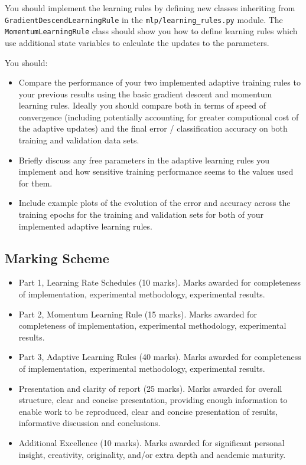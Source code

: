 \documentclass[11pt,]{article}
\begin{document}
You should implement the learning rules by defining new classes
inheriting from \texttt{GradientDescendLearningRule} in the
\texttt{mlp/learning\_rules.py} module. The
\texttt{MomentumLearningRule} class should show you how to define
learning rules which use additional state variables to calculate the
updates to the parameters.

You should:

\begin{itemize}
\itemsep1pt\parskip0pt
\item
  Compare the performance of your two implemented adaptive training
  rules to your previous results using the basic gradient descent and
  momentum learning rules. Ideally you should compare both in terms of
  speed of convergence (including potentially accounting for greater
  computional cost of the adaptive updates) and the final error /
  classification accuracy on both training and validation data sets.
\item
  Briefly discuss any free parameters in the adaptive learning rules you
  implement and how sensitive training performance seems to the values
  used for them.
\item
  Include example plots of the evolution of the error and accuracy
  across the training epochs for the training and validation sets for
  both of your implemented adaptive learning rules.
\end{itemize}

\subsection{Marking Scheme}\label{marking-scheme}

\begin{itemize}
\item
  Part 1, Learning Rate Schedules (10 marks). Marks awarded for
  completeness of implementation, experimental methodology, experimental
  results.
\item
  Part 2, Momentum Learning Rule (15 marks). Marks awarded for
  completeness of implementation, experimental methodology, experimental
  results.
\item
  Part 3, Adaptive Learning Rules (40 marks). Marks awarded for
  completeness of implementation, experimental methodology, experimental
  results.
\item
  Presentation and clarity of report (25 marks). Marks awarded for
  overall structure, clear and concise presentation, providing enough
  information to enable work to be reproduced, clear and concise
  presentation of results, informative discussion and conclusions.
\item
  Additional Excellence (10 marks). Marks awarded for significant
  personal insight, creativity, originality, and/or extra depth and
  academic maturity.
\end{itemize}
\end{document}
